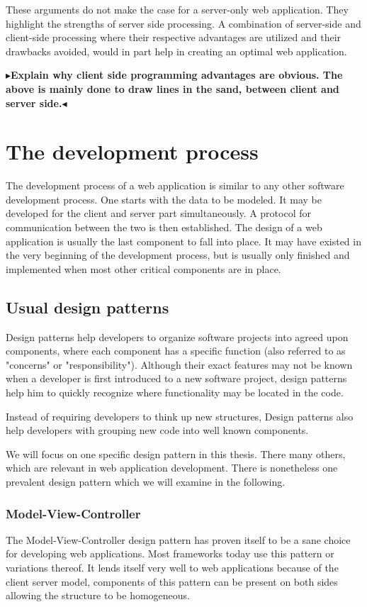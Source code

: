 \documentclass[twoside,11pt,openright]{report}
\newcommand{\todo}[1]{{\color[rgb]{.5,0,0}\textbf{$\blacktriangleright$#1$\blacktriangleleft$}}}
\begin{document}
These arguments do not make the case for a server-only web application.
They highlight the strengths of server side processing. A combination of
server-side and client-side processing where their respective advantages
are utilized and their drawbacks avoided, would in part help in creating
an optimal web application.

\todo{Explain why client side programming advantages are obvious.
The above is mainly done to draw lines in the sand, between client
and server side.}

\section{The development process}
The development process of a web application is similar to any other
software development process. One starts with the data to be modeled.
It may be developed for the client and server part simultaneously.
A protocol for communication between the two is then established.
The design of a web application is usually the last component to fall
into place. It may have existed in the very beginning of the development
process, but is usually only finished and implemented when most other critical
components are in place.

\subsection{Usual design patterns}
Design patterns help developers to organize software projects into agreed upon
components, where each component has a specific function
(also referred to as "concerns" or "responsibility").
Although their exact features may not be known when a developer is first
introduced to a new software project, design patterns help him to quickly
recognize where functionality may be located in the code.

Instead of requiring developers to think up new structures, Design patterns
also help developers with grouping new code into well known components.

We will focus on one specific design pattern in this thesis. There many others,
which are relevant in web application development. There is nonetheless one
prevalent design pattern which we will examine in the following.

\subsubsection{Model-View-Controller}
The Model-View-Controller design pattern has proven itself to be a sane
choice for developing web applications. Most frameworks today use this
pattern or variations thereof.
It lends itself very well to web applications because of the client server
model, components of this pattern can be present on both sides allowing the
structure to be homogeneous.
\end{document}
